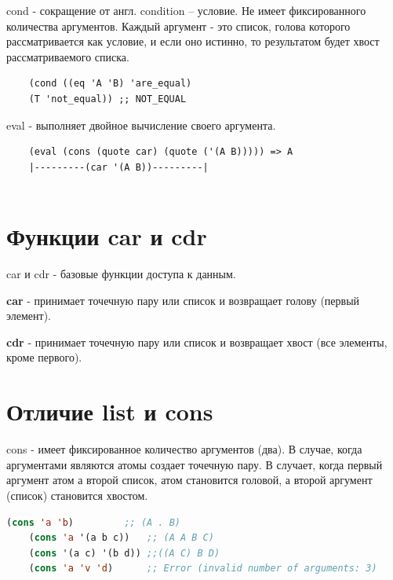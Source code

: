 cond - сокращение от англ. condition – условие. 
Не имеет фиксированного количества аргументов.
Каждый аргумент - это список, голова которого рассматривается как условие, 
и если оно истинно, то результатом будет хвост рассматриваемого списка.

\begin{lstlisting}
	(cond ((eq 'A 'B) 'are_equal)
	(T 'not_equal)) ;; NOT_EQUAL
\end{lstlisting}

eval - выполняет двойное вычисление своего аргумента.

\begin{lstlisting}
	(eval (cons (quote car) (quote ('(A B))))) => A
	|---------(car '(A B))---------|
	
\end{lstlisting}


\section{Функции car и cdr}

car и cdr - базовые функции доступа к данным. 

\textbf{car} - принимает точечную пару или список и возвращает голову (первый элемент).

\textbf{cdr} - принимает точечную пару или список и возвращает хвост (все элементы, кроме первого).

\section{Отличие list и cons}

cons - имеет фиксированное количество аргументов (два). 
В случае, когда аргументами являются атомы создает точечную пару.
В случает, когда первый аргумент атом а второй список, атом становится головой,
а второй аргумент (список) становится хвостом. 
\begin{lstlisting}[language=Lisp]
	(cons 'a 'b) 		 ;; (A . B)
	(cons 'a '(a b c)) 	 ;; (A A B C)
	(cons '(a c) '(b d)) ;;((A C) B D)
	(cons 'a 'v 'd)  	 ;; Error (invalid number of arguments: 3)
\end{lstlisting}

\begin{figure}[ht!]
\end{figure}

